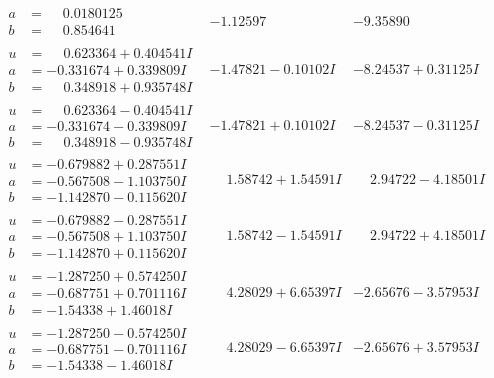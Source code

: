 \documentclass[1p]{elsarticle_modified}
\theoremstyle{definition}
\begin{document}
$$\begin{array}{c|c|c}
\begin{aligned}
a &= \phantom{-}0.0180125\phantom{ +0.000000I} \\
b &= \phantom{-}0.854641\phantom{ +0.000000I}\end{aligned}
 & -1.12597\phantom{ +0.000000I} & -9.35890\phantom{ +0.000000I} \\ \hline\begin{aligned}
u &= \phantom{-}0.623364 + 0.404541 I \\
a &= -0.331674 + 0.339809 I \\
b &= \phantom{-}0.348918 + 0.935748 I\end{aligned}
 & -1.47821 - 0.10102 I & -8.24537 + 0.31125 I \\ \hline\begin{aligned}
u &= \phantom{-}0.623364 - 0.404541 I \\
a &= -0.331674 - 0.339809 I \\
b &= \phantom{-}0.348918 - 0.935748 I\end{aligned}
 & -1.47821 + 0.10102 I & -8.24537 - 0.31125 I \\ \hline\begin{aligned}
u &= -0.679882 + 0.287551 I \\
a &= -0.567508 - 1.103750 I \\
b &= -1.142870 - 0.115620 I\end{aligned}
 & \phantom{-}1.58742 + 1.54591 I & \phantom{-}2.94722 - 4.18501 I \\ \hline\begin{aligned}
u &= -0.679882 - 0.287551 I \\
a &= -0.567508 + 1.103750 I \\
b &= -1.142870 + 0.115620 I\end{aligned}
 & \phantom{-}1.58742 - 1.54591 I & \phantom{-}2.94722 + 4.18501 I \\ \hline\begin{aligned}
u &= -1.287250 + 0.574250 I \\
a &= -0.687751 + 0.701116 I \\
b &= -1.54338 + 1.46018 I\end{aligned}
 & \phantom{-}4.28029 + 6.65397 I & -2.65676 - 3.57953 I \\ \hline\begin{aligned}
u &= -1.287250 - 0.574250 I \\
a &= -0.687751 - 0.701116 I \\
b &= -1.54338 - 1.46018 I\end{aligned}
 & \phantom{-}4.28029 - 6.65397 I & -2.65676 + 3.57953 I \\ \hline\begin{aligned}

\end{aligned}
\end{array}$$
\end{document}
